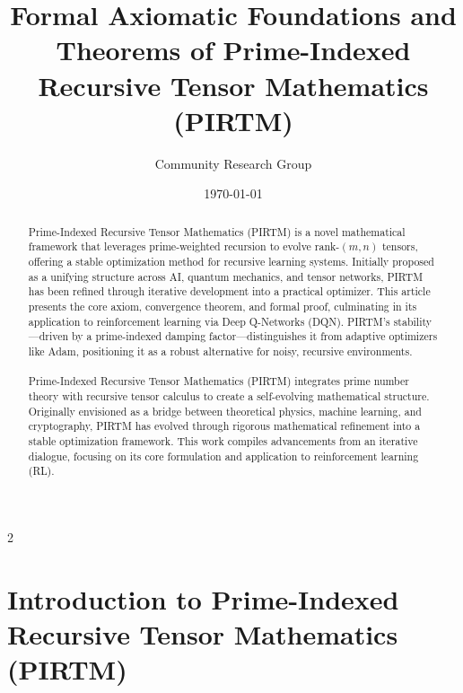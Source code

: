\documentclass{article}
\theoremstyle{plain}
\begin{document}
\title{Formal Axiomatic Foundations and Theorems of Prime-Indexed Recursive Tensor Mathematics (PIRTM)}

\author{Community Research Group}
\date{\today}

\maketitle

\begin{abstract}
Prime-Indexed Recursive Tensor Mathematics (PIRTM) is a novel mathematical framework that leverages prime-weighted recursion to evolve rank-$(m,n)$ tensors, offering a stable optimization method for recursive learning systems. Initially proposed as a unifying structure across AI, quantum mechanics, and tensor networks, PIRTM has been refined through iterative development into a practical optimizer. This article presents the core axiom, convergence theorem, and formal proof, culminating in its application to reinforcement learning via Deep Q-Networks (DQN). PIRTM’s stability—driven by a prime-indexed damping factor—distinguishes it from adaptive optimizers like Adam, positioning it as a robust alternative for noisy, recursive environments.

\paragraph{}Prime-Indexed Recursive Tensor Mathematics (PIRTM) integrates prime number theory with recursive tensor calculus to create a self-evolving mathematical structure. Originally envisioned as a bridge between theoretical physics, machine learning, and cryptography, PIRTM has evolved through rigorous mathematical refinement into a stable optimization framework. This work compiles advancements from an iterative dialogue, focusing on its core formulation and application to reinforcement learning (RL).
\end{abstract}

\newpage
 \begin{multicols}{2}
\begin{singlespace}
\tableofcontents
\end{singlespace}
\end{multicols}
 \newpage

\section{Introduction to Prime-Indexed Recursive Tensor Mathematics (PIRTM)}
\end{document}
